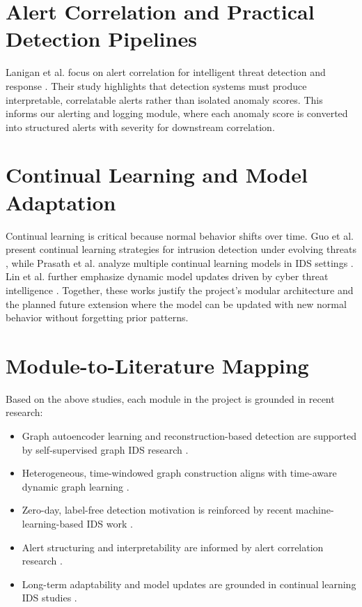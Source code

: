 \section{Alert Correlation and Practical Detection Pipelines}
Lanigan et al. focus on alert correlation for intelligent threat detection and
response \cite{lanigan2025alert}. Their study highlights that detection systems
must produce interpretable, correlatable alerts rather than isolated anomaly
scores. This informs our alerting and logging module, where each anomaly score is
converted into structured alerts with severity for downstream correlation.

\section{Continual Learning and Model Adaptation}
Continual learning is critical because normal behavior shifts over time. Guo et
al. present continual learning strategies for intrusion detection under evolving
threats \cite{guo2025continual}, while Prasath et al. analyze multiple continual
learning models in IDS settings \cite{prasath2025analysis}. Lin et al. further
emphasize dynamic model updates driven by cyber threat intelligence \cite{lin2025evolving}.
Together, these works justify the project's modular architecture and the planned
future extension where the model can be updated with new normal behavior without
forgetting prior patterns.

\section{Module-to-Literature Mapping}
Based on the above studies, each module in the project is grounded in recent
research:
\begin{itemize}
    \item Graph autoencoder learning and reconstruction-based detection are
    supported by self-supervised graph IDS research \cite{guerra2025graphids}.
    \item Heterogeneous, time-windowed graph construction aligns with time-aware
    dynamic graph learning \cite{hayat2025self}.
    \item Zero-day, label-free detection motivation is reinforced by recent
    machine-learning-based IDS work \cite{dai2025zero}.
    \item Alert structuring and interpretability are informed by alert
    correlation research \cite{lanigan2025alert}.
    \item Long-term adaptability and model updates are grounded in continual
    learning IDS studies \cite{guo2025continual,prasath2025analysis,lin2025evolving}.
\end{itemize}

